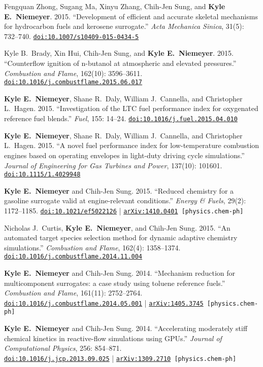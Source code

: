 \documentclass[margin,line,11pt]{res}
\makeatletter
\newlength{\bibhang}
\newlength{\bibsep}
 {\@listi \global\bibsep\itemsep \global\advance\bibsep by\parsep}
\newenvironment{bibenum*}
  {\renewcommand\labelenumi{\theenumi.}%
   \etaremune[
     topsep=0pt,
     itemsep=\bibsep,
     parsep=0pt,partopsep=0pt,
     itemindent=-\bibhang,
     leftmargin={\bibhang+\widthof{[999]}}]}
  {\endetaremune}
\newcommand*{\doi}[1]{\href{http://dx.doi.org/#1}{\nolinkurl{doi:#1}}}
\makeatother
\begin{document}
\begin{resume}
\begin{bibenum*}
\item Fengquan Zhong, Sugang Ma, Xinyu Zhang, Chih-Jen Sung, and \textbf{Kyle E.\ Niemeyer}.
2015.
``Development of efficient and accurate skeletal mechanisms for hydrocarbon fuels and kerosene surrogate.''
\emph{Acta Mechanica Sinica}, 31(5): 732--740.
\doi{10.1007/s10409-015-0434-5}

\item Kyle B.~Brady, Xin Hui, Chih-Jen Sung, and \textbf{Kyle E.~Niemeyer}.
2015.
``Counterflow ignition of n-butanol at atmospheric and elevated pressures.''
\emph{Combustion and Flame}, 162(10): 3596--3611.
\doi{10.1016/j.combustflame.2015.06.017}

\item \textbf{Kyle E.~Niemeyer}, Shane R.~Daly, William J.~Cannella, and Christopher L.~Hagen.
2015.
``Investigation of the LTC fuel performance index for oxygenated reference fuel blends.''
\emph{Fuel}, 155: 14--24.
\doi{10.1016/j.fuel.2015.04.010}

\item \textbf{Kyle E.\ Niemeyer}, Shane R.\ Daly, William J.\ Cannella, and Christopher L.\ Hagen.
2015.
``A novel fuel performance index for low-temperature combustion engines based on operating envelopes in light-duty driving cycle simulations.''
\emph{Journal of Engineering for Gas Turbines and Power}, 137(10): 101601.
\doi{10.1115/1.4029948}

\item \textbf{Kyle E.\ Niemeyer} and Chih-Jen Sung.
2015.
``Reduced chemistry for a gasoline surrogate valid at engine-relevant conditions.''
\emph{Energy \& Fuels}, 29(2): 1172--1185.
\doi{10.1021/ef5022126} |
{\tt \href{http://arxiv.org/abs/1410.0401}{arXiv:1410.0401} [physics.chem-ph]}

\item Nicholas J.\ Curtis, \textbf{Kyle E.\ Niemeyer}, and Chih-Jen Sung.
2015.
``An automated target species selection method for dynamic adaptive chemistry simulations.''
\emph{Combustion and Flame}, 162(4): 1358--1374.
\doi{10.1016/j.combustflame.2014.11.004}

\item \textbf{Kyle E.\ Niemeyer} and Chih-Jen Sung.
2014.
``Mechanism reduction for multicomponent surrogates: a case study using toluene reference fuels.''
\emph{Combustion and Flame}, 161(11): 2752--2764.
\doi{10.1016/j.combustflame.2014.05.001} |
{\tt \href{http://arxiv.org/abs/1405.3745}{arXiv:1405.3745} [physics.chem-ph]}

\item \textbf{Kyle E.\ Niemeyer} and Chih-Jen Sung.
2014.
``Accelerating moderately stiff chemical kinetics in reactive-flow simulations using GPUs.''
\emph{Journal of Computational Physics}, 256: 854--871. \\
\doi{10.1016/j.jcp.2013.09.025} |
{\tt \href{http://arxiv.org/abs/1309.2710}{arXiv:1309.2710} [physics.chem-ph]}


\end{bibenum*}
\end{resume}
\end{document}
